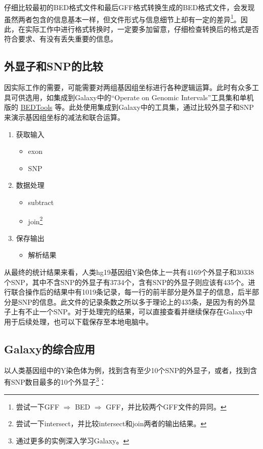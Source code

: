 \documentclass[11pt,a4paper,twoside]{book}
\begin{document}
仔细比较最初的BED格式文件和最后GFF格式转换生成的BED格式文件，会发现虽然两者包含的信息基本一样，但文件形式与信息细节上却有一定的差异\footnote{尝试一下GFF $\Rightarrow$ BED $\Rightarrow$ GFF，并比较两个GFF文件的异同。}。因此，在实际工作中进行格式转换时，一定要多加留意，仔细检查转换后的格式是否符合要求、有没有丢失重要的信息。

\subsection{外显子和SNP的比较}
因实际工作的需要，可能需要对两组基因组坐标进行各种逻辑运算。此时有众多工具可供选用，如集成到Galaxy中的“Operate on Genomic Intervals”工具集和单机版的 \href{http://bedtools.readthedocs.org/en/latest}{BEDTools} 等。此处使用集成到Galaxy中的工具集，通过比较外显子和SNP来演示基因组坐标的减法和联合运算。
\begin{enumerate}
    \item 获取输入
      \begin{itemize}
        \item exon
        \item SNP
      \end{itemize}
    \item 数据处理
      \begin{itemize}
        \item subtract
	\item join\footnote{尝试一下intersect，并比较intersect和join两者的输出结果。}
      \end{itemize}
    \item 保存输出
      \begin{itemize}
        \item 解析结果
      \end{itemize}
\end{enumerate}

从最终的统计结果来看，人类hg19基因组Y染色体上一共有4169个外显子和30338个SNP，其中不含SNP的外显子有3734个，含有SNP的外显子则应该有435个。进行联合操作后的结果中有1019条记录，每一行的前半部分是外显子的信息，后半部分是SNP的信息。此文件的记录条数之所以多于理论上的435条，是因为有的外显子上有不止一个SNP。对于处理完的结果，可以直接查看并继续保存在Galaxy中用于后续处理，也可以下载保存至本地电脑中。

\subsection{Galaxy的综合应用}
以人类基因组中的Y染色体为例，找到含有至少10个SNP的外显子，或者，找到含有SNP数目最多的10个外显子\footnote{通过更多的实例深入学习Galaxy。}：
\end{document}
